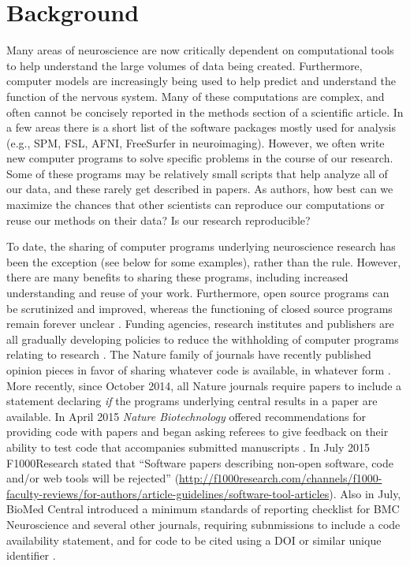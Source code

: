 \documentclass[11pt]{article}
\begin{document}
\clearpage


\renewcommand{\cite}[1]{\autocite{#1}}

\linenumbers

\section*{Background}

Many areas of neuroscience are now critically dependent on
computational tools to help understand the large volumes of data being
created.  Furthermore, computer models are increasingly being used to
help predict and understand the function of the nervous system.  Many
of these computations are complex, and often cannot be concisely
reported in the methods section of a scientific article.  In a few
areas there is a short list of the software packages mostly used for
analysis (e.g., SPM, FSL, AFNI, FreeSurfer in neuroimaging).  However,
we often write new computer programs to solve specific problems in the
course of our research.  Some of these programs may be relatively
small scripts that help analyze all of our data, and these rarely get
described in papers.  As authors, how best can we maximize the chances
that other scientists can reproduce our computations or reuse our
methods on their data?  Is our research reproducible?

To date, the sharing of computer programs underlying neuroscience
research has been the exception (see below for some examples), rather than the rule.  However, there
are many benefits to sharing these programs, including increased
understanding and reuse of your work.  Furthermore, open source programs can be scrutinized and improved, whereas the functioning of closed source
programs remain forever unclear \cite{Vihinen2015}.  Funding agencies, research institutes and publishers are all gradually developing policies to
reduce the withholding of computer programs relating to research
\cite{Morin2012-65e}.  The Nature family of journals have recently
published opinion pieces in favor of sharing whatever code is
available, in whatever form \cite{Barnes2010-iv,Ince2012-225}.  More
recently, since October 2014, all Nature journals require papers to
include a statement declaring \textit{if} the programs underlying central
results in a paper are available. In April 2015 \textit{Nature Biotechnology} offered recommendations for providing code with papers and began asking referees to give feedback on their ability to test code that accompanies submitted manuscripts \cite{NatBiotech2015}.
In July 2015 F1000Research stated that ``Software papers describing non-open software, code and/or web tools will be rejected'' (\url{http://f1000research.com/channels/f1000-faculty-reviews/for-authors/article-guidelines/software-tool-articles}). Also in July, BioMed Central introduced a minimum standards of reporting checklist for BMC Neuroscience and several other journals, requiring subnmissions to include a code availability statement, and for code to be cited using a DOI or similar unique identifier \cite{Kenall2015}.
\end{document}
